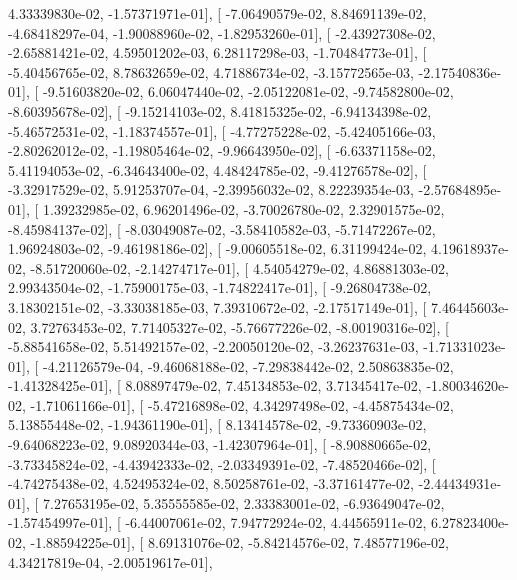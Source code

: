 \documentclass{article}
\begin{document}
          4.33339830e-02,  -1.57371971e-01],
       [ -7.06490579e-02,   8.84691139e-02,  -4.68418297e-04,
         -1.90088960e-02,  -1.82953260e-01],
       [ -2.43927308e-02,  -2.65881421e-02,   4.59501202e-03,
          6.28117298e-03,  -1.70484773e-01],
       [ -5.40456765e-02,   8.78632659e-02,   4.71886734e-02,
         -3.15772565e-03,  -2.17540836e-01],
       [ -9.51603820e-02,   6.06047440e-02,  -2.05122081e-02,
         -9.74582800e-02,  -8.60395678e-02],
       [ -9.15214103e-02,   8.41815325e-02,  -6.94134398e-02,
         -5.46572531e-02,  -1.18374557e-01],
       [ -4.77275228e-02,  -5.42405166e-03,  -2.80262012e-02,
         -1.19805464e-02,  -9.96643950e-02],
       [ -6.63371158e-02,   5.41194053e-02,  -6.34643400e-02,
          4.48424785e-02,  -9.41276578e-02],
       [ -3.32917529e-02,   5.91253707e-04,  -2.39956032e-02,
          8.22239354e-03,  -2.57684895e-01],
       [  1.39232985e-02,   6.96201496e-02,  -3.70026780e-02,
          2.32901575e-02,  -8.45984137e-02],
       [ -8.03049087e-02,  -3.58410582e-03,  -5.71472267e-02,
          1.96924803e-02,  -9.46198186e-02],
       [ -9.00605518e-02,   6.31199424e-02,   4.19618937e-02,
         -8.51720060e-02,  -2.14274717e-01],
       [  4.54054279e-02,   4.86881303e-02,   2.99343504e-02,
         -1.75900175e-03,  -1.74822417e-01],
       [ -9.26804738e-02,   3.18302151e-02,  -3.33038185e-03,
          7.39310672e-02,  -2.17517149e-01],
       [  7.46445603e-02,   3.72763453e-02,   7.71405327e-02,
         -5.76677226e-02,  -8.00190316e-02],
       [ -5.88541658e-02,   5.51492157e-02,  -2.20050120e-02,
         -3.26237631e-03,  -1.71331023e-01],
       [ -4.21126579e-04,  -9.46068188e-02,  -7.29838442e-02,
          2.50863835e-02,  -1.41328425e-01],
       [  8.08897479e-02,   7.45134853e-02,   3.71345417e-02,
         -1.80034620e-02,  -1.71061166e-01],
       [ -5.47216898e-02,   4.34297498e-02,  -4.45875434e-02,
          5.13855448e-02,  -1.94361190e-01],
       [  8.13414578e-02,  -9.73360903e-02,  -9.64068223e-02,
          9.08920344e-03,  -1.42307964e-01],
       [ -8.90880665e-02,  -3.73345824e-02,  -4.43942333e-02,
         -2.03349391e-02,  -7.48520466e-02],
       [ -4.74275438e-02,   4.52495324e-02,   8.50258761e-02,
         -3.37161477e-02,  -2.44434931e-01],
       [  7.27653195e-02,   5.35555585e-02,   2.33383001e-02,
         -6.93649047e-02,  -1.57454997e-01],
       [ -6.44007061e-02,   7.94772924e-02,   4.44565911e-02,
          6.27823400e-02,  -1.88594225e-01],
       [  8.69131076e-02,  -5.84214576e-02,   7.48577196e-02,
          4.34217819e-04,  -2.00519617e-01],
\end{document}
